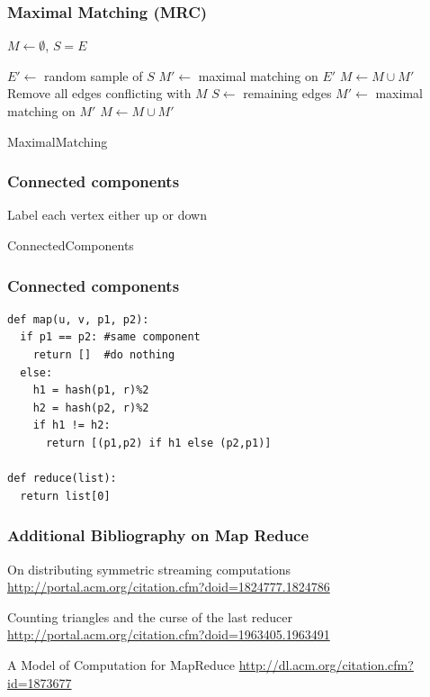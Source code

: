 \documentclass[12pt,aspectratio=169]{beamer}
\begin{document}
\begin{frame}\frametitle{Maximal Matching (MRC)}
  \begin{algorithm}[H]

    $M\gets \emptyset$, $S=E$\;

    $E'\gets$ random sample of $S$\;
    $M'\gets$ maximal matching on $E'$ 
    $M\gets M\cup M'$\;
    Remove all edges conflicting with $M$\;
    $S\gets $ remaining edges\;
    $M'\gets$ maximal matching on $M'$ 
    $M\gets M\cup M'$\;
    \label{alg:MRC-MC2}
    \caption{MaximalMatching}
  \end{algorithm}
\end{frame}

\begin{frame}\frametitle{Connected components}
  \begin{algorithm}[H]
    Label each vertex either \alert{up} or \alert{down}\;
    \caption{ConnectedComponents}
  \end{algorithm}
\end{frame}


\begin{frame}[fragile]\frametitle{Connected components}
  \begin{verbatim}
def map(u, v, p1, p2):
  if p1 == p2: #same component
    return []  #do nothing
  else:
    h1 = hash(p1, r)%2
    h2 = hash(p2, r)%2
    if h1 != h2:
      return [(p1,p2) if h1 else (p2,p1)]

def reduce(list):
  return list[0]
\end{verbatim}
\end{frame}


\begin{frame}\frametitle{Additional Bibliography on Map Reduce}
\small
On distributing symmetric streaming computations
\url{http://portal.acm.org/citation.cfm?doid=1824777.1824786}

Counting triangles and the curse of the last reducer
\url{http://portal.acm.org/citation.cfm?doid=1963405.1963491}

A Model of Computation for MapReduce \url{http://dl.acm.org/citation.cfm?id=1873677}
\end{frame}
\end{document}
